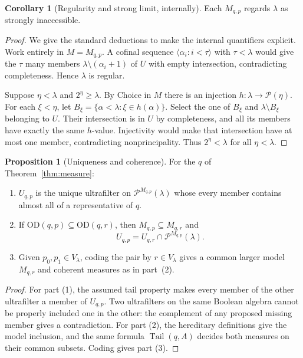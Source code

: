 \documentclass[11pt,letterpaper]{article}
\theoremstyle{definition}
\newtheorem{proposition}[definition]{Proposition}
\newtheorem{corollary}[definition]{Corollary}
\numberwithin{equation}{section}
\newcommand{\OD}{\mathrm{OD}}
\newcommand{\Pow}{\mathcal P}
\newcommand{\Tail}{\operatorname{Tail}}
\begin{document}
\begin{corollary}[Regularity and strong limit, internally]\label{cor:inacc}
Each $M_{q,p}$ regards $\lambda$ as strongly inaccessible.
\end{corollary}

\begin{proof}
We give the standard deductions to make the internal quantifiers
explicit. Work entirely in $M=M_{q,p}$. A cofinal sequence
$\langle\alpha_i:i<\tau\rangle$ with $\tau<\lambda$ would give the
$\tau$ many members $\lambda\setminus(\alpha_i+1)$ of $U$ with empty
intersection, contradicting completeness. Hence $\lambda$ is regular.

Suppose $\eta<\lambda$ and $2^\eta\ge\lambda$. By Choice in $M$ there
is an injection $h:\lambda\to\Pow(\eta)$. For each $\xi<\eta$, let
$B_\xi=\{\alpha<\lambda:\xi\in h(\alpha)\}$. Select the one of
$B_\xi$ and $\lambda\setminus B_\xi$ belonging to $U$.
Their intersection is in $U$ by completeness, and all its members
have exactly the same $h$-value. Injectivity would make that
intersection have at most one member, contradicting nonprincipality.
Thus $2^\eta<\lambda$ for all $\eta<\lambda$.
\end{proof}

\begin{proposition}[Uniqueness and coherence]\label{prop:coherence}
For the $q$ of Theorem~\ref{thm:measure}:
\begin{enumerate}
\item $U_{q,p}$ is the unique ultrafilter on $\Pow^{M_{q,p}}(\lambda)$
whose every member contains almost all of a representative of $q$.
\item If $\OD(q,p)\subseteq\OD(q,r)$, then $M_{q,p}\subseteq M_{q,r}$ and
\[
 U_{q,p}=U_{q,r}\cap\Pow^{M_{q,p}}(\lambda).
\]
\item Given $p_0,p_1\in V_\lambda$, coding the pair by
$r\in V_\lambda$ gives a common larger model $M_{q,r}$ and coherent
measures as in part~(2).
\end{enumerate}
\end{proposition}

\begin{proof}
For part (1), the assumed tail property makes every member of the
other ultrafilter a member of $U_{q,p}$. Two ultrafilters on the same
Boolean algebra cannot be properly included one in the other: the
complement of any proposed missing member gives a contradiction.
For part (2), the hereditary definitions give the model inclusion,
and the same formula $\Tail(q,A)$ decides both measures on their
common subsets. Coding gives part (3).
\end{proof}
\end{document}
